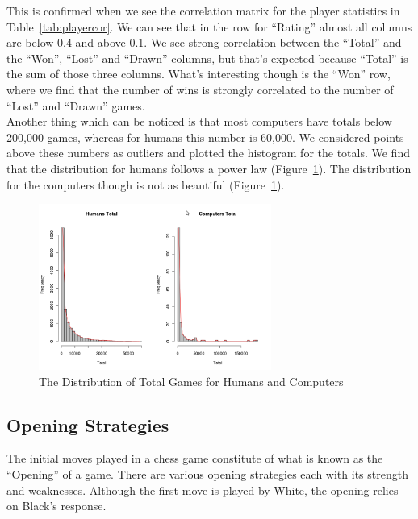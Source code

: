 \documentclass{article}
\begin{document}
This is confirmed when we see the correlation matrix for the player statistics in Table~\ref{tab:playercor}. We can see that in the row for ``Rating'' almost all columns are below 0.4 and above 0.1. We see strong correlation between the ``Total'' and the ``Won'', ``Lost'' and ``Drawn'' columns, but that's expected because ``Total'' is the sum of those three columns. What's interesting though is the ``Won'' row, where we find that the number of wins is strongly correlated to the number of ``Lost'' and ``Drawn'' games. \\



Another thing which can be noticed is that most computers have totals below 200,000 games, whereas for humans this number is 60,000. We considered points above these numbers as outliers and plotted the histogram for the totals. We find that the distribution for humans follows a power law (Figure~\ref{fig:totalsdistr}). The distribution for the computers though is not as beautiful (Figure~\ref{fig:totalsdistr}).\\

\begin{figure} [htp]
\begin{center}
\includegraphics[width=3in]{totals_distr.png}
\end{center}
\caption{The Distribution of Total Games for Humans and Computers}
\label{fig:totalsdistr}
\end{figure}

\clearpage
\subsection{Opening Strategies}
The initial moves played in a chess game constitute of what is known as the ``Opening'' of a game. There are various opening strategies each with its strength and weaknesses. Although the first move is played by White, the opening relies on Black's response.\\
\end{document}
